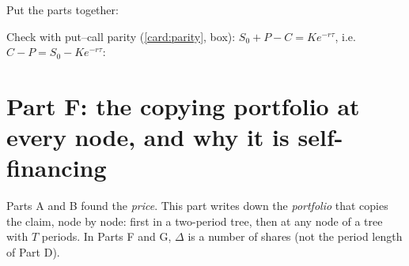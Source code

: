 \begin{steps}[resume]
\item Put the parts together:
\begin{deriv}
\end{deriv}

\item Check with put--call parity (\cref{card:parity}, box): $S_0+P-C=Ke^{-r\tau}$, i.e.\ $C-P=S_0-Ke^{-r\tau}$:
\begin{deriv}
\end{deriv}
\end{steps}


\section*{Part F: the copying portfolio at every node, and why it is self-financing}

Parts A and B found the \emph{price}. This part writes down the \emph{portfolio} that copies the claim, node by node: first in a two-period tree, then at any node of a tree with $T$ periods. In Parts F and G, $\Delta$ is a number of shares (not the period length of Part D).

